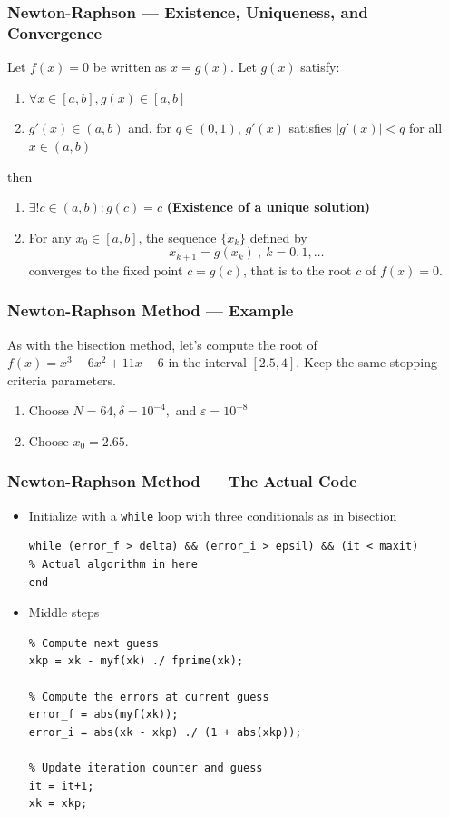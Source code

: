 \documentclass[11pt,xcolor={svgnames},aspectratio=169,usepdftitle=false,notheorems]{beamer}
\begin{document}
\begin{frame}
  \frametitle{Newton-Raphson --- Existence, Uniqueness, and Convergence}
\begin{theorem}\label{thm:fixed_point}
Let $f(x) = 0$ be written as $x = g(x)$. Let $g(x)$ satisfy:
\begin{enumerate}
  \item $\forall x\in [a,b], g(x)\in [a,b]$
  \item $g'(x)\in (a, b)$ and, for $q\in(0,1)$, $g'(x)$ satisfies $\lvert g'(x) \rvert < q$ for all $x\in (a,b)$
\end{enumerate}
then
\begin{enumerate}
  \item $\exists! c\in(a,b) : g(c) = c$ {\footnotesize \alert{\textbf{(Existence of a unique solution)}}}
  \item For any $x_0\in [a, b]$, the sequence $\{x_k\}$ defined by
  \[
  x_{k+1} = g(x_k) \ , \ k = 0,1,\ldots
  \]
  converges to the fixed point $c = g(c)$, that is to the root $c$ of $f(x) = 0$.
\end{enumerate}
\end{theorem}
\end{frame}

\begin{frame}
  \frametitle{Newton-Raphson Method --- Example}
As with the bisection method, let's compute the root of $f(x) = x^3 - 6x^2 + 11x - 6$ in the interval $[2.5, 4]$. Keep the same stopping criteria parameters.
\begin{enumerate}
  \item Choose $N = 64, \delta = 10^{-4},$ and $\varepsilon = 10^{-8}$
  \item Choose $x_0 = 2.65$.
\end{enumerate}
\end{frame}

\begin{frame}[fragile]
  \frametitle{Newton-Raphson Method --- The Actual Code}
  \begin{itemize}
    \item Initialize with a \verb;while; loop with three conditionals as in bisection
\begin{lstlisting}
while (error_f > delta) && (error_i > epsil) && (it < maxit)
% Actual algorithm in here
end     
\end{lstlisting}
    \item Middle steps
\begin{lstlisting}
% Compute next guess
xkp = xk - myf(xk) ./ fprime(xk);
    
% Compute the errors at current guess
error_f = abs(myf(xk));
error_i = abs(xk - xkp) ./ (1 + abs(xkp));

% Update iteration counter and guess
it = it+1;
xk = xkp;
\end{lstlisting}
\end{itemize}
\end{frame}
\end{document}
